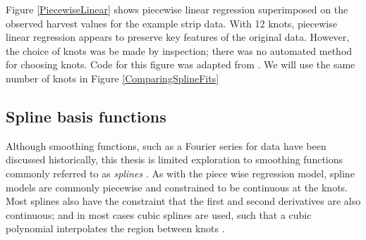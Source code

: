 \documentclass[phdcss]{SDSUThesis}
\begin{document}
Figure \ref{PiecewiseLinear} shows piecewise linear regression superimposed on the observed harvest values for the example strip data. With 12 knots, piecewise linear regression appears to preserve key features of the original data. However, the choice of knots was be made by inspection; there was no automated method for choosing knots. Code for this figure was adapted from \cite{wood-2017}. We will use the same number of knots in Figure \ref{ComparingSplineFits}

                           

\clearpage

\subsection{Spline basis functions}

Although smoothing functions, such as a Fourier series \cite{schoenberg-04-1946} for data have been discussed historically, this thesis is limited exploration to smoothing functions commonly referred to as \textit{splines} \cite{perperoglou-2019}.  As with the piece wise regression model, spline models are commonly piecewise and constrained to be continuous at the knots. Most splines also have the constraint that the first and second derivatives are also continuous; and in most cases cubic splines are used, such that a cubic polynomial interpolates the region between knots \cite{perperoglou-2019}.

\end{document}
